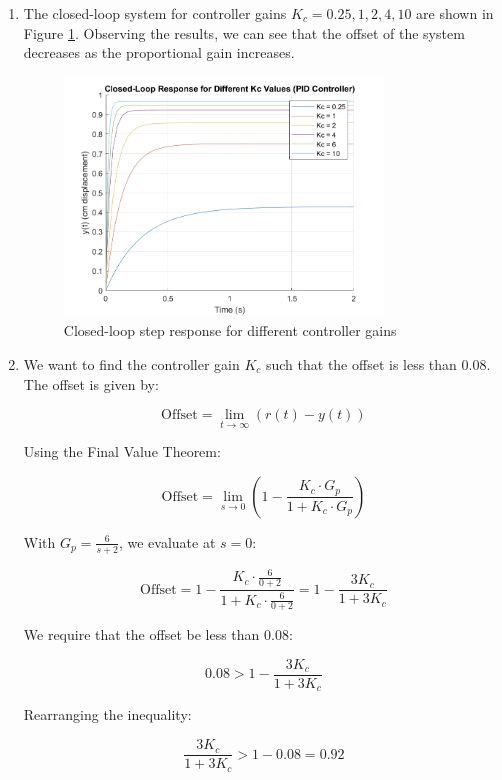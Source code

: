 \documentclass[12pt]{article}
\begin{document}
\begin{enumerate}
\begin{enumerate}
    \pagebreak

    \item
    The closed-loop system for controller gains $K_c = {0.25, 1, 2, 4, 10}$ are shown in Figure \ref{fig:figure1_6}. Observing the results, we can see that the offset of the system decreases as the proportional gain increases.

    \begin{figure}[H]
      \centering
      \includegraphics[width=0.8\textwidth]{Figures/figure1_5.png}
      \caption{Closed-loop step response for different controller gains}
      \label{fig:figure1_6}
    \end{figure}

    \item
    We want to find the controller gain \(K_c\) such that the offset is less than 0.08. The offset is given by:

    \[
    \text{Offset} = \lim_{t \to \infty} (r(t) - y(t))
    \]

    Using the Final Value Theorem:

    \[
    \text{Offset} = \lim_{s \to 0} \left(1 - \frac{K_c \cdot G_p}{1 + K_c \cdot G_p}\right)
    \]

    With \(G_p = \frac{6}{s+2}\), we evaluate at \(s=0\):

    \[
    \text{Offset} = 1 - \frac{K_c \cdot \frac{6}{0+2}}{1 + K_c \cdot \frac{6}{0+2}} = 1 - \frac{3K_c}{1 + 3K_c}
    \]

    We require that the offset be less than 0.08:

    \[
    0.08 > 1 - \frac{3K_c}{1 + 3K_c}
    \]

    Rearranging the inequality:

    \[
    \frac{3K_c}{1 + 3K_c} > 1 - 0.08 = 0.92
    \]


\end{enumerate}
\end{enumerate}
\end{document}
